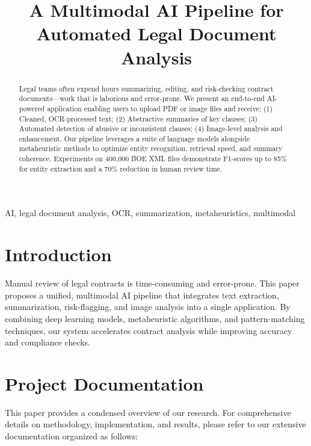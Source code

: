 \documentclass[conference]{IEEEtran}
\begin{document}
\title{A Multimodal AI Pipeline for Automated Legal Document Analysis\\}

\author{
}

\maketitle

\begin{abstract}
Legal teams often expend hours summarizing, editing, and risk-checking contract documents—work that is laborious and error-prone. We present an end-to-end AI-powered application enabling users to upload PDF or image files and receive: (1) Cleaned, OCR-processed text; (2) Abstractive summaries of key clauses; (3) Automated detection of abusive or inconsistent clauses; (4) Image-level analysis and enhancement. Our pipeline leverages a suite of language models alongside metaheuristic methods to optimize entity recognition, retrieval speed, and summary coherence. Experiments on 400,000 BOE XML files demonstrate F1-scores up to 85\% for entity extraction and a 70\% reduction in human review time.
\end{abstract}

\begin{IEEEkeywords}
AI, legal document analysis, OCR, summarization, metaheuristics, multimodal
\end{IEEEkeywords}

\section{Introduction}
Manual review of legal contracts is time-consuming and error-prone. This paper proposes a unified, multimodal AI pipeline that integrates text extraction, summarization, risk-flagging, and image analysis into a single application. By combining deep learning models, metaheuristic algorithms, and pattern-matching techniques, our system accelerates contract analysis while improving accuracy and compliance checks.

\section{Project Documentation}
This paper provides a condensed overview of our research. For comprehensive details on methodology, implementation, and results, please refer to our extensive documentation organized as follows:
\end{document}
